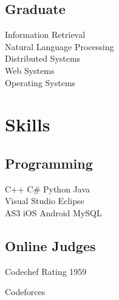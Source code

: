\documentclass[]{deedy-resume-openfont}
\begin{document}
\begin{minipage}[t]{0.30\textwidth}
\subsection{Graduate}
Information Retrieval \\
Natural Language Processing \\
Distributed Systems \\
Web Systems \\
Operating Systems
\sectionsep


\section{Skills}
\subsection{Programming}
C++ \textbullet{}   C\# \textbullet{} Python \textbullet{} Java \\
Visual Studio \textbullet{} Eclipse \textbullet{} \\
AS3 \textbullet{} iOS \textbullet{} Android \textbullet{} MySQL
\sectionsep

\subsection{Online Judges}
Codechef Rating 1959

Codeforces
%
%

\end{minipage} 
\hfill
\end{document}
